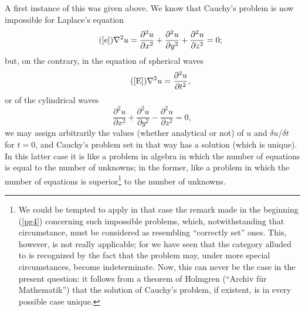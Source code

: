 \documentclass[12pt,oneside]{book}
\begin{document}
A first instance of this was given above. We know that Cauchy's problem is now impossible for Laplace's equation 
\begin{equation}
    \tag{\ref{e}}
    \nabla^2u=\frac{\partial^2u}{\partial x^2}+\frac{\partial^2u}{\partial y^2}+\frac{\partial^2u}{\partial z^2}=0;
\end{equation}
but, on the contrary, in the equation of spherical waves
\begin{equation}
    \tag{\ref{E}}
    \nabla^2u=\frac{\partial^2u}{\partial t^2},
\end{equation}
or of the cylindrical waves 
\begin{equation}
    \tag{E'}\label{E'}
    \frac{\partial^2u}{\partial x^2}+\frac{\partial^2u}{\partial y^2}-\frac{\partial^2u}{\partial z^2}=0,
\end{equation}
we may assign arbitrarily the values (whether analytical or not) of $u$ and $\delta u/\delta t$ for $t=0$, and Cauchy's problem set in that way has a solution (which is unique). In this latter case it is like a problem in algebra in which the number of equations is equal to the number of unknowns; in the former, like a problem in which the number of equations is superior\footnote{We could be tempted to apply in that case the remark made in the beginning (\ref{pg4}) concerning such impossible problems, which, notwithstanding that circumstance, must be considered as resembling ``correctly set'' ones. This, however, is not really applicable; for we have seen that the category alluded to is recognized by the fact that the problem may, under more special circumstances, become indeterminate. Now, this can never be the case in the present question: it follows from a theorem of Holmgren (``Archiv f\"ur Mathematik'') that the solution of Cauchy's problem, if existent, is in every possible case unique.} to the number of unknowns. \par
\end{document}
